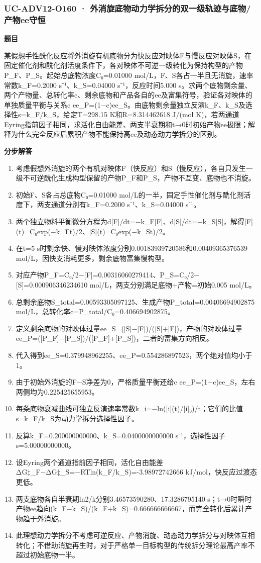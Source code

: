 \documentclass[UTF8,11pt,a4paper]{ctexart}
\begin{document}
\subsubsection*{UC-ADV12-O160 · 外消旋底物动力学拆分的双一级轨迹与底物/产物ee守恒}
\noindent\textbf{题目}\par
某假想手性酰化反应将外消旋有机底物分为快反应对映体F与慢反应对映体S，在固定催化剂和酰化剂活度条件下，各对映体不可逆一级转化为保持构型的产物P\_F、P\_S。起始总底物浓度C₀=0.01000 mol/L，F、S各占一半且无消旋，速率常数k\_F=0.2000 s⁻¹、k\_S=0.04000 s⁻¹，反应时间5.000 s。求两个底物剩余量、两个产物量、总转化率c、剩余底物和产品各自的ee及富集符号，验证各对映体的单独质量平衡与关系c ee\_P=(1−c)ee\_S。由底物剩余量独立反演k\_F、k\_S及选择性s=k\_F/k\_S，给定T=298.15 K和R=8.314462618 J/(mol K)，若两通道Eyring指前因子相同，求活化自由能差、两支半衰期和t→0时初始产物ee极限；解释为什么完全反应后累积产物不能保持高ee及动态动力学拆分的区别。\par
\medskip\noindent\textbf{分步解答}
\begin{enumerate}
\item 考虑假想外消旋的两个有机对映体F（快反应）和S（慢反应），各自只发生一级不可逆酰化生成构型保留的产物P\_F和P\_S，产物不互变、底物也不消旋。
\item 初始F、S各占总底物C₀=0.01000 mol/L的一半，固定手性催化剂与酰化剂活度下，两支通道分别有k\_F=0.2000 s⁻¹、k\_S=0.04000 s⁻¹。
\item 两个独立物料平衡微分方程为d[F]/dt=−k\_F[F]、d[S]/dt=−k\_S[S]，解得[F](t)=C₀exp(−k\_Ft)/2、[S](t)=C₀exp(−k\_St)/2。
\item 在t=5 s时剩余快、慢对映体浓度分别0.00183939720586和0.00409365376539 mol/L，因快支消耗更多，剩余底物富集慢构型。
\item 对应产物P\_F=C₀/2−[F]=0.00316060279414、P\_S=C₀/2−[S]=0.000906346234610 mol/L，两支分别满足底物+产物=初始0.005 mol/L。
\item 总剩余底物S\_total=0.00593305097125、生成产物P\_total=0.00406694902875 mol/L，总转化率c=P\_total/C₀=0.406694902875。
\item 定义剩余底物的对映体过量ee\_S=([S]−[F])/([S]+[F])，产物的对映体过量ee\_P=([P\_F]−[P\_S])/([P\_F]+[P\_S])，二者的富集方向相反。
\item 代入得到ee\_S=0.379948962255、ee\_P=0.554286897523，两个绝对值均小于1。
\item 由于初始外消旋的F−S净差为0，严格质量平衡还给c ee\_P=(1−c)ee\_S，左右两侧均为0.225425655953。
\item 每条底物衰减曲线可独立反演速率常数k\_i=−ln([i](t)/[i]₀)/t；它们的比值s=k\_F/k\_S为动力学拆分选择性因子。
\item 反算k\_F=0.200000000000、k\_S=0.0400000000000 s⁻¹，选择性因子s=5.00000000000。
\item 设Eyring两个通道指前因子相同，活化自由能差ΔG‡\_F−ΔG‡\_S=−RTln(k\_F/k\_S)=-3.98972742666 kJ/mol，快反应过渡态更低。
\item 两支底物各自半衰期ln2/k分别3.46573590280、17.3286795140 s；t→0时瞬时产物ee趋向(k\_F−k\_S)/(k\_F+k\_S)=0.666666666667，而完全转化后累计产物趋于外消旋。
\item 此理想动力学拆分不考虑可逆反应、产物消旋、动态动力学拆分与对映体互相转化；不借助消旋再生时，对于严格单一目标构型的传统拆分理论最高产率不超过初始底物一半。
\end{enumerate}
\end{document}
